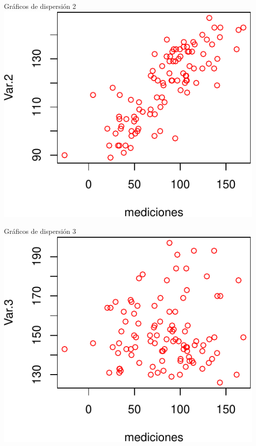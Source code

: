 \documentclass[
  11pt,
  ignorenonframetext,
]{beamer}
\begin{document}
\begin{frame}{Gráficos de dispersión 2}
\protect\hypertarget{gruxe1ficos-de-dispersiuxf3n-2}{}
\includegraphics{Correlacion-espacial_files/figure-beamer/unnamed-chunk-14-1.pdf}
\end{frame}

\begin{frame}{Gráficos de dispersión 3}
\protect\hypertarget{gruxe1ficos-de-dispersiuxf3n-3}{}
\includegraphics{Correlacion-espacial_files/figure-beamer/unnamed-chunk-15-1.pdf}
\end{frame}
\end{document}
